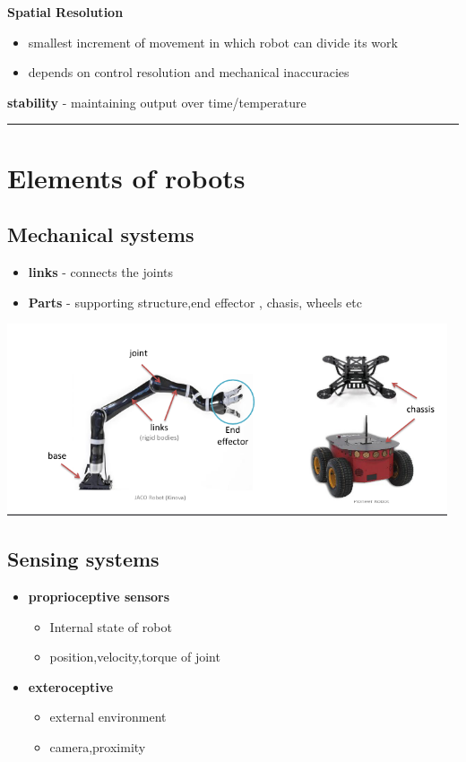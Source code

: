 \documentclass{article}
\begin{document}
\newpage
\textbf{Spatial Resolution}
\begin{itemize}
	\item smallest increment of movement in which robot can divide its work
	\item depends on control resolution and mechanical inaccuracies
\end{itemize}
\textbf{stability} - maintaining output over time/temperature
\par\noindent\rule{\textwidth}{0.4pt}
\newpage

\section{Elements of robots}
\subsection{Mechanical systems}
\begin{itemize}
	\item \textbf{links} - connects the joints
	\item \textbf{Parts} - supporting structure,end effector , chasis, wheels etc
\end{itemize}
\includegraphics[width=13cm]{img/mechanicalSystem.png}
\subsection{Sensing systems}
\begin{itemize}
	\item \textbf{proprioceptive sensors}
	      \begin{itemize}
		      \item Internal state of robot
		      \item position,velocity,torque of joint
	      \end{itemize}
	\item \textbf{exteroceptive}
	      \begin{itemize}
		      \item external environment
		      \item camera,proximity
	      \end{itemize}
\end{itemize}
\end{document}
